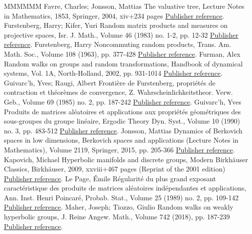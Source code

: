 \begin{thebibliography}{MMMMMM}
 Favre, Charles; Jonsson, Mattias The valuative tree, Lecture Notes in Mathematics, 1853, Springer, 2004, xiv+234 pages \href{https://ahl.centre-mersenne.org/item/AHL_2019__2__515_0/#valtree}{Publisher reference}.
 Furstenberg, Harry; Kifer, Yuri Random matrix products and measures on projective spaces, Isr. J. Math., Volume 46 (1983) no. 1-2, pp. 12-32 \href{https://ahl.centre-mersenne.org/item/AHL_2019__2__515_0/#furstenberg-kifer}{Publisher reference}.
 Furstenberg, Harry Noncommuting random products, Trans. Am. Math. Soc., Volume 108 (1963), pp. 377-428 \href{https://ahl.centre-mersenne.org/item/AHL_2019__2__515_0/#furstenberg}{Publisher reference}.
 Furman, Alex Random walks on groups and random transformations, Handbook of dynamical systems, Vol. 1A, North-Holland, 2002, pp. 931-1014 \href{https://ahl.centre-mersenne.org/item/AHL_2019__2__515_0/#furman}{Publisher reference}.
 Guivarc’h, Yves; Raugi, Albert Frontière de Furstenberg, propriétés de contraction et théorèmes de convergence, Z. Wahrscheinlichkeitstheor. Verw. Geb., Volume 69 (1985) no. 2, pp. 187-242 \href{https://ahl.centre-mersenne.org/item/AHL_2019__2__515_0/#guivarch-raugi}{Publisher reference}.
 Guivarc’h, Yves Produits de matrices aléatoires et applications aux propriétés géométriques des sous-groupes du groupe linéaire, Ergodic Theory Dyn. Syst., Volume 10 (1990) no. 3, pp. 483-512 \href{https://ahl.centre-mersenne.org/item/AHL_2019__2__515_0/#guivarch}{Publisher reference}.
 Jonsson, Mattias Dynamics of Berkovich spaces in low dimensions, Berkovich spaces and applications (Lecture Notes in Mathematics), Volume 2119, Springer, 2015, pp. 205-366 \href{https://ahl.centre-mersenne.org/item/AHL_2019__2__515_0/#jonsson}{Publisher reference}.
 Kapovich, Michael Hyperbolic manifolds and discrete groups, Modern Birkhäuser Classics, Birkhäuser, 2009, xxviii+467 pages (Reprint of the 2001 edition) \href{https://ahl.centre-mersenne.org/item/AHL_2019__2__515_0/#kapovich}{Publisher reference}.
 Le Page, Émile Régularité du plus grand exposant caractéristique des produits de matrices aléatoires indépendantes et applications, Ann. Inst. Henri Poincaré, Probab. Stat., Volume 25 (1989) no. 2, pp. 109-142 \href{https://ahl.centre-mersenne.org/item/AHL_2019__2__515_0/#lepage-holder}{Publisher reference}.
 Maher, Joseph; Tiozzo, Giulio Random walks on weakly hyperbolic groups, J. Reine Angew. Math., Volume 742 (2018), pp. 187-239 \href{https://ahl.centre-mersenne.org/item/AHL_2019__2__515_0/#maher-tiozzo}{Publisher reference}.

\end{thebibliography}
